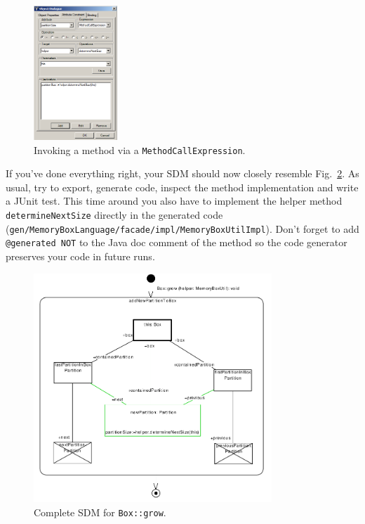 \clearpage

\begin{figure}[htbp]
\begin{center}
  \includegraphics[width=0.28\textwidth]{pics/sdmBilder/grow/sdm66}
  \caption{Invoking a method via a \texttt{MethodCallExpression}.}  
  \label{fig:sdm_grow_4}
\end{center}
\end{figure}

If you've done everything right, your SDM should now closely resemble
Fig.~\ref{fig:sdm_grow_5}.  As usual, try to export, generate code, inspect the
method implementation and write a JUnit test.  This time around you also have to
implement the helper method \texttt{determineNextSize} directly in the
generated code
(\texttt{gen/\-MemoryBoxLanguage/\-facade/\-impl/\-MemoryBoxUtilImpl}). Don't
forget to add \texttt{@generated NOT} to the Java doc comment of the
method so the code generator preserves your code in future runs.

\begin{figure}[htbp]
\begin{center}
  \includegraphics[width=0.8\textwidth]{pics/sdmBilder/grow/sdm67}
  \caption{Complete SDM for \texttt{Box::grow}.}  
  \label{fig:sdm_grow_5}
\end{center}
\end{figure}
